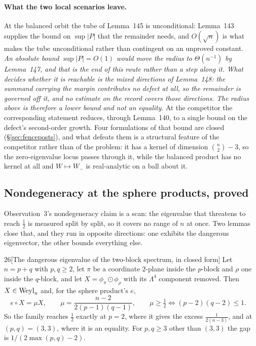 \paragraph{What the two local scenarios leave.} At the balanced orbit the tube of Lemma~145 is unconditional: Lemma~143 supplies the bound on $\sup\lvert P\rvert$ that the remainder needs, and $O(\sqrt n)$ is what makes the tube unconditional rather than contingent on an unproved constant. \emph{An absolute bound $\sup\lvert P\rvert=O(1)$ would move the radius to $\Theta(n^{-1})$ by Lemma~147, and that is the end of this route rather than a step along it. What decides whether it is reachable is the mixed directions of Lemma~148: the summand carrying the margin contributes no defect at all, so the remainder is governed off it, and no estimate on the record covers those directions. The radius above is therefore a lower bound and not an equality.} At the competitor the corresponding statement reduces, through Lemma~140, to a single bound on the defect's second-order growth. Four formulations of that bound are closed (\S\ref{sec:fenceposts}), and what defeats them is a structural feature of the competitor rather than of the problem: it has a kernel of dimension $\binom n2-3$, so the zero-eigenvalue locus passes through it, while the balanced product has no kernel at all and $W\mapsto W_-$ is real-analytic on a ball about it.

\subsection{Nondegeneracy at the sphere products, proved}\label{sec:nondeg}

Observation~3's nondegeneracy claim is a scan: the eigenvalue that threatens to reach $\tfrac12$ is measured split by split, so it covers no range of $n$ at once. Two lemmas close that, and they run in opposite directions: one exhibits the dangerous eigenvector, the other bounds everything else.

\begin{Lem}{26}[The dangerous eigenvalue of the two-block spectrum, in closed form]
Let $n=p+q$ with $p,q\ge2$, let $\pi$ be a coordinate $2$-plane inside the $p$-block and $\rho$ one inside the $q$-block, and let $X=\phi_\pi\odot\phi_\rho$ with its $\Lambda^4$ component removed. Then $X\in\mathrm{Weyl}_n$ and, for the sphere product's $e$,
\[
e\circ X=\mu X,\qquad \mu=\frac{n-2}{2(p-1)(q-1)},\qquad \mu\ge\tfrac12\iff(p-2)(q-2)\le1 .
\]
So the family reaches $\tfrac12$ exactly at $p=2$, where it gives the excess $\tfrac1{2(n-3)}$, and at $(p,q)=(3,3)$, where it is an equality. For $p,q\ge3$ other than $(3,3)$ the gap is $1/(2\max(p,q)-2)$.
\end{Lem}


